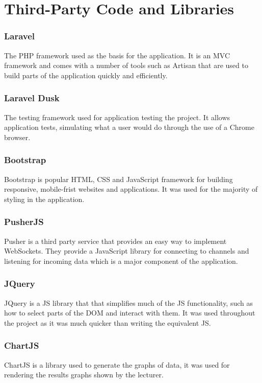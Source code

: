 \chapter{Third-Party Code and Libraries}
\subsection{Laravel}
The PHP framework used as the basis for the application\cite{laravel}. It is an MVC framework and comes with a number of tools such as Artisan\cite{artisan} that are used to build parts of the application quickly and efficiently.
\subsection{Laravel Dusk}
The testing framework used for application testing the project\cite{dusk}. It allows application tests, simulating what a user would do through the use of a Chrome browser.
\subsection{Bootstrap}
Bootstrap is popular HTML, CSS and JavaScript framework for building responsive, mobile-frist websites and applications\cite{bootstrap}. It was used for the majority of styling in the application.
\subsection{PusherJS}
Pusher is a third party service that provides an easy way to implement WebSockets\cite{pusher-what-is}. They provide a JavaScript library for connecting to channels and listening for incoming data which is a major component of the application.
\subsection{JQuery}
JQuery is a JS library that that simplifies much of the JS functionality, such as how to select parts of the DOM and interact with them\cite{jquery}. It was used throughout the project as it was much quicker than writing the equivalent JS.
\subsection{ChartJS}
ChartJS is a library used to generate the graphs of data, it was used for rendering the results graphs shown by the lecturer\cite{chartjs}.